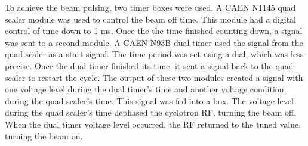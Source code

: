 To achieve the beam pulsing, two timer boxes were used.
A CAEN N1145 quad scaler module was used to control the beam off time.
This module had a digital control of time down to 1 ms.
Once the the time finished counting down, a signal was sent to a second module. 
A CAEN N93B dual timer used the signal from the quad scaler as a start signal.
The time period was set using a dial, which was less precise. 
Once the dual timer finished its time, it sent a signal back to the quad scaler to restart the cycle.
The output of these two modules created a signal with one voltage level during the dual timer's time and another voltage condition during the quad scaler's time.
This signal was fed into a box.
The voltage level during the quad scaler's time dephased the cyclotron RF, turning the beam off.
When the dual timer voltage level occurred, the RF returned to the tuned value, turning the beam on.  


